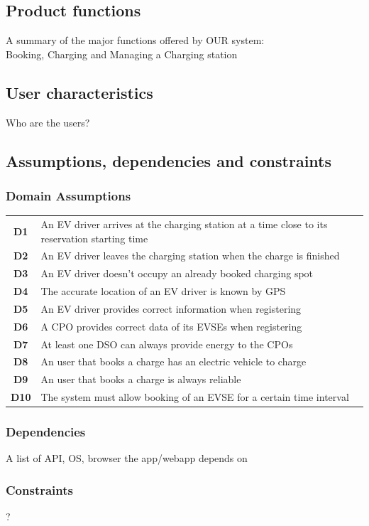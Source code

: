 \subsection{Product functions}
A summary of the major functions offered by OUR system:\\ Booking, Charging and Managing a Charging station


\subsection{User characteristics}
Who are the users?

\subsection{Assumptions, dependencies and constraints}
\subsubsection*{Domain Assumptions}
\begin{table}[H]
      \begin{tabularx}{\textwidth}{cX}
            \toprule
            \textbf{D1}  & An EV driver arrives at the charging station at a time close to its reservation starting time \\
            \textbf{D2}  & An EV driver leaves the charging station when the charge is finished                          \\
            \textbf{D3}  & An EV driver doesn't occupy an already booked charging spot                                   \\
            \textbf{D4}  & The accurate location of an EV driver is known by GPS                                         \\
            \textbf{D5}  & An EV driver provides correct information when registering                                    \\
            \textbf{D6}  & A CPO provides correct data of its EVSEs when registering                                     \\
            \textbf{D7}  & At least one DSO can always provide energy to the CPOs                                        \\
            \textbf{D8}  & An user that books a charge has an electric vehicle to charge                                 \\
            \textbf{D9}  & An user that books a charge is always reliable                                                \\
            \textbf{D10} & The system must allow booking of an EVSE for a certain time interval                          \\ \bottomrule
      \end{tabularx}
\end{table}
\subsubsection*{Dependencies}
A list of API, OS, browser the app/webapp depends on
\subsubsection*{Constraints}
?
